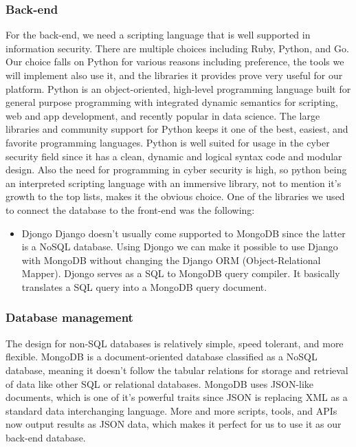 \subsubsection{Back-end}
For the back-end, we need a scripting language that is well supported in information security. There are multiple choices including Ruby, Python, and Go. Our choice falls on Python for various reasons including preference, the tools we will implement also use it, and the libraries it provides prove very useful for our platform.
Python is an object-oriented, high-level programming language built for general purpose programming with integrated dynamic semantics for scripting, web and app development, and recently popular in data science. The large libraries and community support for Python keeps it one of the best, easiest, and favorite programming languages. Python is well suited for usage in the cyber security field since it has a clean, dynamic and logical syntax code and modular design. Also the need for programming in cyber security is high, so python being an interpreted scripting language with an immersive library, not to mention it's growth to the top lists, makes it the obvious choice. One of the libraries we used to connect the database to the front-end was the following:
\begin{itemize}
    \item Djongo
    Django doesn't usually come supported to MongoDB since the latter is a NoSQL database. Using Djongo we can make it possible to use Django with MongoDB without changing the Django ORM (Object-Relational Mapper). Djongo serves as a SQL to MongoDB query compiler. It basically translates a SQL query into a MongoDB query document.
\end{itemize}

\subsubsection{Database management}
The design for non-SQL databases is relatively simple, speed tolerant, and more flexible. MongoDB is a document-oriented database classified as a NoSQL database, meaning it doesn't follow the tabular relations for storage and retrieval of data like other SQL or relational databases. MongoDB uses JSON-like documents, which is one of it's powerful traits since JSON is replacing XML as a standard data interchanging language. More and more scripts, tools, and APIs now output results as JSON data, which makes it perfect for us to use it as our back-end database.



